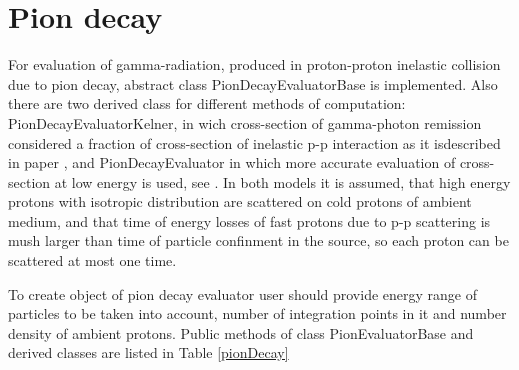 \section{Pion decay}

For evaluation of gamma-radiation, produced in proton-proton inelastic collision due to pion decay, abstract class PionDecayEvaluatorBase is implemented. Also there are two derived class for different methods of computation: PionDecayEvaluatorKelner, in wich cross-section of gamma-photon remission considered a fraction of cross-section of inelastic p-p interaction as it isdescribed in paper \cite{Kelner}, and PionDecayEvaluator in which more accurate evaluation of cross-section at low energy is used, see \cite{Kafexhiu}. In both models it is assumed, that high energy protons with isotropic distribution are scattered on cold protons of ambient medium, and that time of energy losses of fast protons due to p-p scattering is mush larger than time of particle confinment in the source, so each proton can be scattered at most one time.

To create object of pion decay evaluator user should provide energy range of particles to be taken into account, number of integration points in it and number density of ambient protons. Public methods of class PionEvaluatorBase and derived classes are listed in Table \ref{pionDecay}

